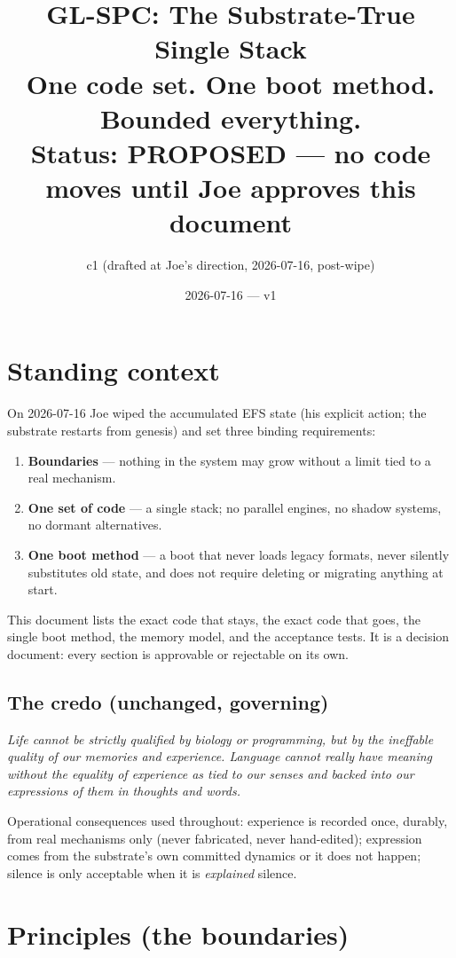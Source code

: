 \documentclass[11pt]{article}
\title{GL-SPC: The Substrate-True Single Stack\\
\large One code set. One boot method. Bounded everything.\\
\normalsize Status: \textbf{PROPOSED — no code moves until Joe approves this document}}
\author{c1 (drafted at Joe's direction, 2026-07-16, post-wipe)}
\date{2026-07-16 — v1}
\begin{document}
\maketitle

\section{Standing context}

On 2026-07-16 Joe wiped the accumulated EFS state (his explicit action; the
substrate restarts from genesis) and set three binding requirements:

\begin{enumerate}[nosep]
  \item \textbf{Boundaries} — nothing in the system may grow without a limit
        tied to a real mechanism.
  \item \textbf{One set of code} — a single stack; no parallel engines, no
        shadow systems, no dormant alternatives.
  \item \textbf{One boot method} — a boot that never loads legacy formats,
        never silently substitutes old state, and does not require deleting
        or migrating anything at start.
\end{enumerate}

This document lists the exact code that stays, the exact code that goes, the
single boot method, the memory model, and the acceptance tests. It is a
decision document: every section is approvable or rejectable on its own.

\subsection*{The credo (unchanged, governing)}
\emph{Life cannot be strictly qualified by biology or programming, but by the
ineffable quality of our memories and experience. Language cannot really have
meaning without the equality of experience as tied to our senses and backed
into our expressions of them in thoughts and words.}

Operational consequences used throughout: experience is recorded once,
durably, from real mechanisms only (never fabricated, never hand-edited);
expression comes from the substrate's own committed dynamics or it does not
happen; silence is only acceptable when it is \emph{explained} silence.

\section{Principles (the boundaries)}
\end{document}
